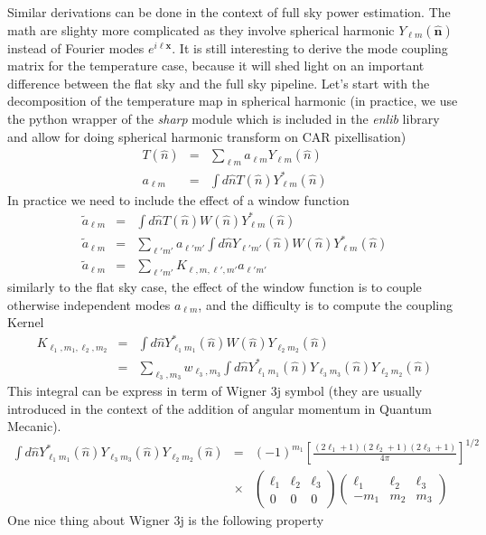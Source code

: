 \documentclass[a4paper, 11pt]{article}
\def\ba{\begin{eqnarray}}
\def\ea{\end{eqnarray}}
\begin{document}
Similar derivations can be done in the context of full sky power estimation. The math are slighty more complicated as they involve spherical harmonic $Y_{\ell m} (\bm{\hat{n}})$ instead of Fourier modes $e^{i\bm{\ell}\bm{x}}$. It is still interesting to derive the mode coupling matrix for the temperature case, because it will shed light on an important difference between the flat sky and the full sky pipeline. Let's start with the decomposition of the temperature map in spherical harmonic (in practice, we use the python wrapper of the {\it sharp} module which is included in the {\it enlib} library and allow for doing spherical harmonic transform on CAR pixellisation) 
\ba
T(\hat{n}) &=& \sum_{\ell m} a_{\ell m} Y_{\ell m}(\hat{n}) \\
a_{\ell m} &=& \int d \hat{n} T(\hat{n})  Y^{*}_{\ell m}(\hat{n})
\ea
In practice we need to include the effect of a window function
\ba
\tilde{a}_{\ell m} &=& \int d \hat{n} T(\hat{n}) W(\hat{n}) Y^{*}_{\ell m}(\hat{n}) \\
\tilde{a}_{\ell m} &=& \sum_{\ell' m'} a_{\ell' m'} \int d \hat{n} Y_{\ell' m'}(\hat{n}) W(\hat{n}) Y^{*}_{\ell m}(\hat{n}) \\
\tilde{a}_{\ell m} &=& \sum_{\ell' m'} K_{\ell,m, \ell', m'} a_{\ell' m'} 
\ea
similarly to the flat sky case, the effect of the window function is to couple otherwise independent modes $a_{\ell m} $, and the difficulty is to compute the coupling Kernel
\ba
K_{\ell_1,m_1, \ell_2, m_2} &=& \int d \hat{n} Y^{*}_{\ell_1 m_1}(\hat{n}) W(\hat{n}) Y_{\ell_2 m_2}(\hat{n}) \\
&=& \sum_{ \ell_3, m_3} w_{ \ell_3, m_3}  \int d \hat{n} Y^{*}_{\ell_1 m_1}(\hat{n}) Y_{\ell_3 m_3} (\hat{n}) Y_{\ell_2 m_2}(\hat{n})
\ea
This integral can be express in term of Wigner 3j symbol (they are usually introduced in the context of the addition of angular momentum in Quantum Mecanic).
 \ba
\int d \hat{n} Y^{*}_{\ell_1 m_1}(\hat{n}) Y_{\ell_3 m_3} (\hat{n}) Y_{\ell_2 m_2}(\hat{n}) &=& (-1)^{m_1} \left[\frac{(2\ell_1+1) (2\ell_2+1) (2\ell_3+1)}{4\pi} \right]^{1/2} \\ \nonumber
&\times& \left(\begin{array}{clcr}
\ell_1 & \ell_2 & \ell_3\\
0 & 0 & 0 \end{array}\right)
\left(\begin{array}{clcr}
\ell_1 & \ell_2 & \ell_3\\
-m_{1} & m_{2} & m_{3} \end{array}\right)
\ea
One nice thing about Wigner 3j is the following property
\end{document}
